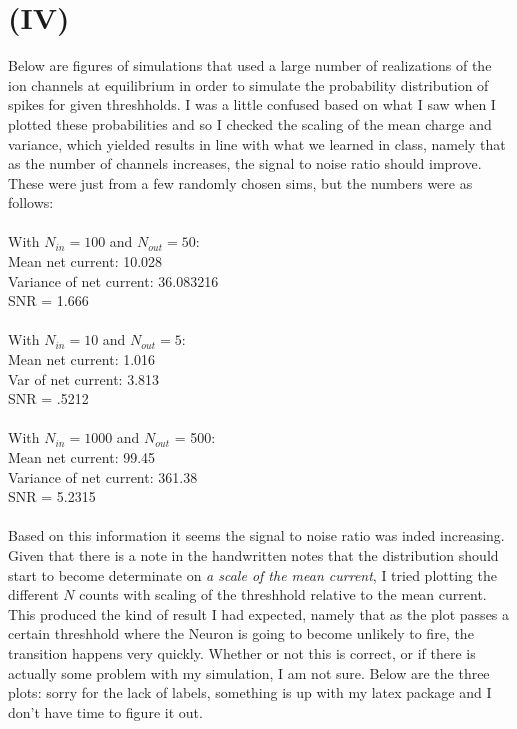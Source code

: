 \documentclass{article}
\begin{document}
\section*{\textbf{(IV)}}
Below are figures of simulations that used a large number of realizations of the ion channels at equilibrium in order to simulate the probability distribution of spikes for given threshholds. I was a little confused based on what I saw when I plotted these probabilities and so I checked the scaling of the mean charge and variance, which yielded results in line with what we learned in class, namely that as the number of channels increases, the signal to noise ratio should improve. These were just from a few randomly chosen sims, but the numbers were as follows:\\
\\
With $N_{in} = 100$ and $N_{out} = 50$:\\
Mean net current: 10.028\\
Variance of net current: 36.083216\\
SNR = 1.666\\
\\
With $N_{in} = 10$ and $N_{out} = 5$:\\
Mean net current: 1.016\\
Var of net current: 3.813\\
SNR = .5212\\
\\
With $N_{in} = 1000$ and $N_{out}$ = 500:\\
Mean net current: 99.45\\
Variance of net current: 361.38\\
SNR = 5.2315\\
\\
Based on this information it seems the signal to noise ratio was inded increasing. Given that there is a note in the handwritten notes that the distribution should start to become determinate on \textit{a scale of the mean current}, I tried plotting the different $N$ counts with scaling of the threshhold relative to the mean current. This produced the kind of result I had expected, namely that as the plot passes a certain threshhold where the Neuron is going to become unlikely to fire, the transition happens very quickly. Whether or not this is correct, or if there is actually some problem with my simulation, I am not sure. Below are the three plots: sorry for the lack of labels, something is up with my latex package and I don't have time to figure it out.\\
\end{document}
